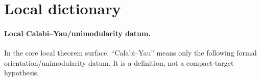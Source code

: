 \providecommand{\Prim}{\operatorname{Prim}}
\providecommand{\Conn}{\operatorname{Conn}}

\section*{Local dictionary}

\begingroup
\small
\setlength{\parindent}{0pt}
\setlength{\tabcolsep}{3pt}
\renewcommand{\arraystretch}{1.15}

\paragraph{Local Calabi--Yau/unimodularity datum.}
In the core local theorem surface, ``Calabi--Yau'' means only the
following formal orientation/unimodularity datum.  It is a definition,
not a compact-target hypothesis.
